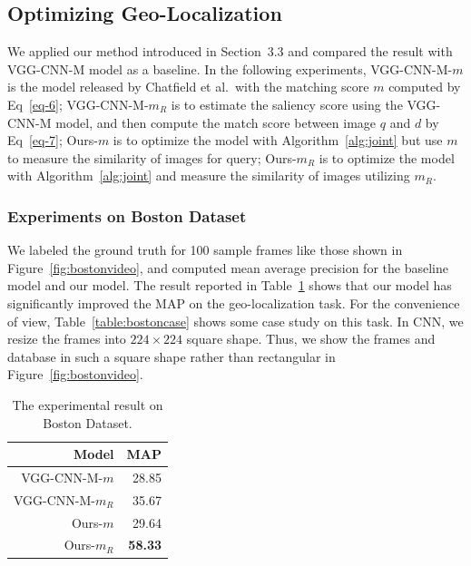 \subsection{Optimizing Geo-Localization}
\par
We applied our method introduced in Section~3.3 and compared the result with VGG-CNN-M model as a baseline. In the following experiments, VGG-CNN-M-$m$ is the model released by Chatfield et al.~\cite{chatfield2014return}with the matching score $m$ computed by Eq~\eqref{eq-6}; VGG-CNN-M-$m_R$ is to estimate the saliency score using the VGG-CNN-M model, and then compute the match score between image $q$ and $d$ by Eq~\eqref{eq-7}; Ours-$m$ is to optimize the model with Algorithm~\ref{alg:joint} but use $m$ to measure the similarity of images for query; Ours-$m_R$ is to optimize the model with Algorithm~\ref{alg:joint} and measure the similarity of images utilizing $m_R$. 
\subsubsection{Experiments on Boston Dataset}
\par
We labeled the ground truth for 100 sample frames like those shown in Figure~\ref{fig:bostonvideo}, and computed mean average precision for the baseline model and our model. The result reported in Table~\ref{table:bostonresult} shows that our model has significantly improved the MAP on the geo-localization task. For the convenience of view, Table~\ref{table:bostoncase} shows some case study on this task. In CNN, we resize the frames into $224 \times 224$ square shape. Thus, we show the frames and database in such a square shape rather than rectangular in Figure~\ref{fig:bostonvideo}.
\begin{table}[htbp]
\begin{tabular}{|r|r|}
\hline
Model & MAP \\
\hline \hline
VGG-CNN-M-$m$ & 28.85\\
VGG-CNN-M-$m_R$ & 35.67 \\
Ours-$m$ & 29.64 \\
Ours-$m_R$ & \textbf{58.33} \\
\hline
\end{tabular}
\caption{The experimental result on Boston Dataset.}
\label{table:bostonresult}
\end{table}

